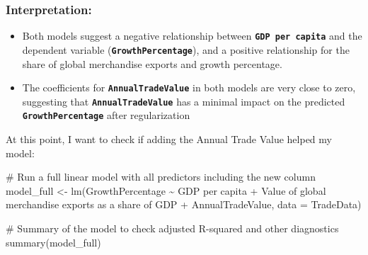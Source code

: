 \documentclass[
  10pt,
]{article}
\newenvironment{Shaded}{\begin{snugshade}}{\end{snugshade}}
\newcommand{\AttributeTok}[1]{\textcolor[rgb]{0.40,0.45,0.13}{#1}}
\newcommand{\CommentTok}[1]{\textcolor[rgb]{0.37,0.37,0.37}{#1}}
\newcommand{\FunctionTok}[1]{\textcolor[rgb]{0.28,0.35,0.67}{#1}}
\newcommand{\NormalTok}[1]{\textcolor[rgb]{0.00,0.23,0.31}{#1}}
\newcommand{\OtherTok}[1]{\textcolor[rgb]{0.00,0.23,0.31}{#1}}
\newcommand{\SpecialCharTok}[1]{\textcolor[rgb]{0.37,0.37,0.37}{#1}}
\newcommand{\StringTok}[1]{\textcolor[rgb]{0.13,0.47,0.30}{#1}}
\begin{document}
\subsubsection{\texorpdfstring{\textbf{Interpretation:}}{Interpretation:}}\label{interpretation}

\begin{itemize}
\item
  Both models suggest a negative relationship between
  \textbf{\texttt{GDP\ per\ capita}} and the dependent variable
  (\textbf{\texttt{GrowthPercentage}}), and a positive relationship for
  the share of global merchandise exports and growth percentage.
\item
  The coefficients for \textbf{\texttt{AnnualTradeValue}} in both models
  are very close to zero, suggesting that
  \textbf{\texttt{AnnualTradeValue}} has a minimal impact on the
  predicted \textbf{\texttt{GrowthPercentage}} after regularization
\end{itemize}

At this point, I want to check if adding the Annual Trade Value helped
my model:

\begin{Shaded}
\begin{Highlighting}[]
\CommentTok{\# Run a full linear model with all predictors including the new column}
\NormalTok{model\_full }\OtherTok{\textless{}{-}} \FunctionTok{lm}\NormalTok{(GrowthPercentage }\SpecialCharTok{\textasciitilde{}} \StringTok{\textasciigrave{}}\AttributeTok{GDP per capita}\StringTok{\textasciigrave{}} \SpecialCharTok{+} \StringTok{\textasciigrave{}}\AttributeTok{Value of global merchandise exports as a share of GDP}\StringTok{\textasciigrave{}} \SpecialCharTok{+}\NormalTok{ AnnualTradeValue, }\AttributeTok{data =}\NormalTok{ TradeData)}

\CommentTok{\# Summary of the model to check adjusted R{-}squared and other diagnostics}
\FunctionTok{summary}\NormalTok{(model\_full)}
\end{Highlighting}
\end{Shaded}
\end{document}
